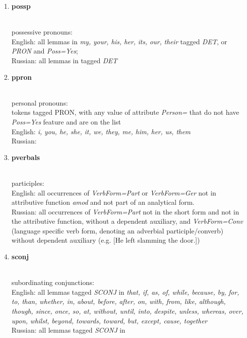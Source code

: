 \begin{enumerate}
	\item \hypertarget{ft:possp}{\textbf{possp}} \\
		possessive pronouns: \\
		English: all lemmas in \textit{my, your, his, her, its, our, their} tagged \textit{DET}, or \textit{PRON} and \textit{Poss=Yes}; \\
		Russian: all lemmas in  tagged \textit{DET}
	
	\item \hypertarget{ft:ppron}{\textbf{ppron}} \\
		personal pronouns: \\
		tokens tagged PRON, with any value of attribute \textit{Person=} that do not have \textit{Poss=Yes} feature and are on the list\\ 
		English: \textit{i, you, he, she, it, we, they, me, him, her, us, them} \\
		Russian: 
	
	\item \hypertarget{ft:pverbals}{\textbf{pverbals}} \\
		participles: \\
		English: all occurrences of \textit{VerbForm=Part} or \textit{VerbForm=Ger} not in attributive function \textit{amod} and not part of an analytical form. \\
		Russian: all occurrences of \textit{VerbForm=Part} not in the short form and not in the attributive function, without a
		dependent auxiliary, and \textit{VerbForm=Conv} (language specific verb form, denoting an adverbial participle/converb) without dependent auxiliary (e.g.  [He left slamming the door.])
	
	\item \hypertarget{ft:sconj}{\textbf{sconj}} \\
		subordinating conjunctions: \\
		English: all lemmas tagged \textit{SCONJ} in \textit{that, if, as, of, while, because, by, for, to,
		than, whether, in, about, before, after, on, with, from, like, although, though, since,
		once, so, at, without, until, into, despite, unless, whereas, over, upon, whilst,
		beyond, towards, toward, but, except, cause, together} \\
		Russian: all lemmas tagged \textit{SCONJ} in  
	

\end{enumerate}
